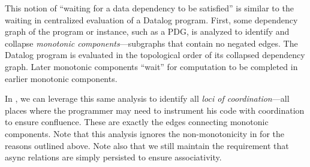 This notion of ``waiting for a data dependency to be satisfied'' is similar to
the waiting in centralized evaluation of a Datalog program.  First, some
dependency graph of the program or instance, such as a PDG, is analyzed to
identify and collapse {\em monotonic components}---subgraphs that contain no
negated edges.  The Datalog program is evaluated in the topological order of
its collapsed dependency graph.  Later monotonic components ``wait'' for
computation to be completed in earlier monotonic components.  

In \lang, we can leverage this same analysis to identify all {\em loci of
coordination}---all places where the programmer may need to instrument his code
with coordination to ensure confluence.  These are exactly the edges connecting
monotonic components.  Note that this analysis ignores the non-monotonicity in
 for the reasons outlined above.  Note also that we still
maintain the requirement that async relations are simply persisted to ensure
associativity. 






